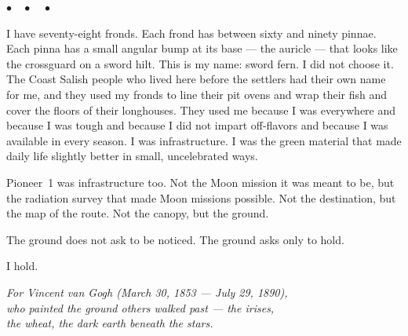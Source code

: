 \documentclass[12pt, letterpaper]{article}
\begin{document}
\begin{center}
$\bullet\quad\bullet\quad\bullet$
\end{center}

I have seventy-eight fronds. Each frond has between sixty and ninety pinnae. Each pinna has a small angular bump at its base --- the auricle --- that looks like the crossguard on a sword hilt. This is my name: sword fern. I did not choose it. The Coast Salish people who lived here before the settlers had their own name for me, and they used my fronds to line their pit ovens and wrap their fish and cover the floors of their longhouses. They used me because I was everywhere and because I was tough and because I did not impart off-flavors and because I was available in every season. I was infrastructure. I was the green material that made daily life slightly better in small, uncelebrated ways.

Pioneer~1 was infrastructure too. Not the Moon mission it was meant to be, but the radiation survey that made Moon missions possible. Not the destination, but the map of the route. Not the canopy, but the ground.

The ground does not ask to be noticed. The ground asks only to hold.

I hold.

\vspace{2em}
\begin{center}
\textit{For Vincent van Gogh (March 30, 1853 --- July 29, 1890),\\who painted the ground others walked past --- the irises,\\the wheat, the dark earth beneath the stars.}
\end{center}
\end{document}
